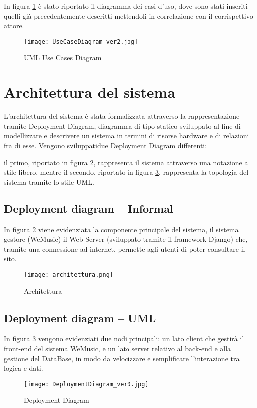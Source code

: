 In figura \ref{fig-uml-use-cases} è stato riportato il diagramma dei casi d'uso, dove sono stati inseriti quelli
già precedentemente descritti mettendoli in correlazione con il corrispettivo attore.

\begin{figure}[H]
      \centering
      \texttt{[image: UseCaseDiagram\_ver2.jpg]}
      \caption{UML Use Cases Diagram}
      \label{fig-uml-use-cases}
\end{figure}


\newpage
\section{Architettura del sistema}
L'architettura del sistema è stata formalizzata attraverso la rappresentazione tramite Deployment Diagram, diagramma di tipo statico 
sviluppato al fine di modellizzare e descrivere un sistema in termini di risorse hardware e di relazioni fra di esse.
Vengono sviluppatidue Deployment Diagram differenti:

il primo, riportato in figura \ref{architettura}, rappresenta il sistema
attraverso una notazione a stile libero, mentre il secondo, riportato in figura \ref{dep_diagram}, rappresenta
la topologia del sistema tramite lo stile UML. 

\vspace{2cm}

\subsection{Deployment diagram -- Informal}
In figura \ref{architettura} viene evidenziata la componente principale del sistema, il sistema gestore (WeMusic)
il Web Server (sviluppato tramite il framework Django) che, tramite una connessione ad internet, permette 
agli utenti di poter consultare il sito.
\begin{figure}[H]
      \centering
      \texttt{[image: architettura.png]}
      \caption{Architettura}
      \label{architettura}
\end{figure}


\newpage
\subsection{Deployment diagram -- UML}
In figura \ref{dep_diagram} vengono evidenziati due nodi principali: 
un lato client che gestirà il front-end del sistema WeMusic, e un lato server relativo 
al back-end e alla gestione del DataBase, in modo da velocizzare e semplificare l'interazione tra logica e dati. 
\begin{figure}[H]
    \centering
    \texttt{[image: DeploymentDiagram\_ver0.jpg]}
    \caption{Deployment Diagram}
    \label{dep_diagram}
\end{figure}


